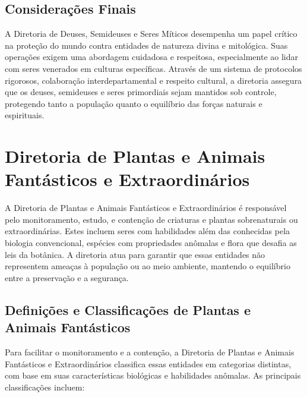 \section{Considerações Finais}

A Diretoria de Deuses, Semideuses e Seres Míticos desempenha um papel crítico na proteção do mundo contra entidades de natureza divina e mitológica. Suas operações exigem uma abordagem cuidadosa e respeitosa, especialmente ao lidar com seres venerados em culturas específicas. Através de um sistema de protocolos rigorosos, colaboração interdepartamental e respeito cultural, a diretoria assegura que os deuses, semideuses e seres primordiais sejam mantidos sob controle, protegendo tanto a população quanto o equilíbrio das forças naturais e espirituais.

\chapter{Diretoria de Plantas e Animais Fantásticos e Extraordinários}

A Diretoria de Plantas e Animais Fantásticos e Extraordinários é responsável pelo monitoramento, estudo, e contenção de criaturas e plantas sobrenaturais ou extraordinárias. Estes incluem seres com habilidades além das conhecidas pela biologia convencional, espécies com propriedades anômalas e flora que desafia as leis da botânica. A diretoria atua para garantir que essas entidades não representem ameaças à população ou ao meio ambiente, mantendo o equilíbrio entre a preservação e a segurança.

\section{Definições e Classificações de Plantas e Animais Fantásticos}
Para facilitar o monitoramento e a contenção, a Diretoria de Plantas e Animais Fantásticos e Extraordinários classifica essas entidades em categorias distintas, com base em suas características biológicas e habilidades anômalas. As principais classificações incluem:

